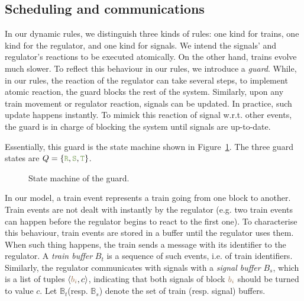 \documentclass[runningheads]{llncs}
\newcommand{\tuple}[1]{\ensuremath{\langle #1\rangle}}
\newcommand{\posFmt}[1]{{\color{poscolor}{#1}}}
\newcommand{\bid}[1]{\ensuremath{\posFmt{b_{#1}}}}
\newcommand{\guardFmt}[1]{{\color{guardcolor} \ensuremath{\mathtt{#1}}}}
\newcommand{\guardT}{\guardFmt{T}}
\newcommand{\guardS}{\guardFmt{S}}
\newcommand{\guardR}{\guardFmt{R}}
\newcommand{\bufferFmt}[1]{#1}
\newcommand{\bufTrainSet}{\ensuremath{\bufferFmt{\mathbb{B}_t}}\xspace}
\newcommand{\bufSigSet}{\ensuremath{\bufferFmt{\mathbb{B}_s}}\xspace}
\newcommand{\bufTrain}{\ensuremath{\bufferFmt{B_t}}\xspace}
\newcommand{\bufSig}{\ensuremath{\bufferFmt{B_s}}\xspace}
\begin{document}

\subsection{Scheduling and communications}

In our dynamic rules, we distinguish three kinds of rules: one kind for trains, one kind for the regulator, and one kind for  signals. We intend the signals' and regulator's reactions to be executed atomically. On the other hand, trains evolve much slower. To reflect this behaviour in our rules, we introduce a \emph{guard}. While, in our rules, the reaction of the regulator can take several steps, to implement atomic reaction, the guard blocks the rest of the system. Similarly, upon any train movement or regulator reaction, signals can be updated. In practice, such update happens instantly. To mimick this reaction of signal w.r.t. other events, the guard is in charge of blocking the system until signals are up-to-date.

Essentially, this guard is the state machine shown in Figure~\ref{fig:state_machine_guard}. The three guard states are $Q = \{\guardR, \guardS, \guardT\}$.
\begin{figure}
	\centering
	\caption{State machine of the guard.}
	\label{fig:state_machine_guard}
\end{figure}

In our model, a train event represents a train going from one block to another. Train events are not dealt with instantly by the regulator (e.g. two train events can happen before the regulator begins to react to the first one). To characterise this behaviour, train events are stored in a buffer until the regulator uses them. When such thing happens, the train sends a message with its identifier to the regulator. A \emph{train buffer} \bufTrain is a sequence of such events, i.e. of train identifiers.
Similarly, the regulator communicates with signals with a \emph{signal buffer} \bufSig, which is a list of tuples $\tuple{\bid{i}, c}$, indicating that both signals of block $\bid{i}$ should be turned to value $c$. Let \bufTrainSet (resp. \bufSigSet) denote the set of train (resp. signal) buffers.
\end{document}
